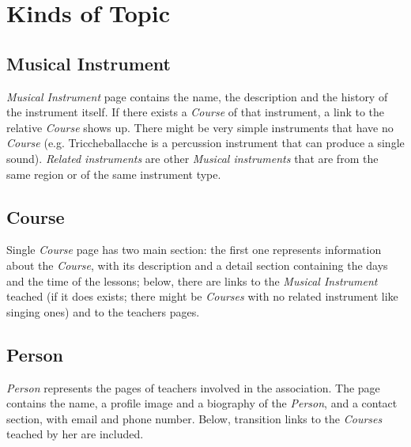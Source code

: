\documentclass[../../DD.tex]{subfiles}
\begin{document}
\section{Kinds of Topic}
	\subsection{Musical Instrument}
		\textit{Musical Instrument} page contains the name, the description and the history of the instrument itself. If there exists a \textit{Course} of that instrument, a link to the relative \textit{Course} shows up. There might be very simple instruments that have no \textit{Course} (e.g. Triccheballacche is a percussion instrument that can produce a single sound). \textit{Related instruments} are other \textit{Musical instruments} that are from the same region or of the same instrument type.
		\newline

	\subsection{Course}
		Single \textit{Course} page has two main section: the first one represents information about the \textit{Course}, with its description and a detail section containing the days and the time of the lessons; below, there are links to the \textit{Musical Instrument} teached (if it does exists; there might be \textit{Courses} with no related instrument like singing ones) and to the teachers pages.  
		\newline

	\subsection{Person}
		\textit{Person} represents the pages of teachers involved in the association. The page contains the name, a profile image and a biography of the \textit{Person}, and a contact section, with email and phone number. Below, transition links to the \textit{Courses} teached by her are included.
		\newline
\end{document}
